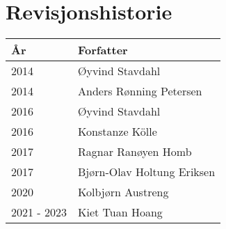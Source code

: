 \section*{Revisjonshistorie}
\begin{center}
 \begin{tabular}{|p{2.5cm} p{5.5cm}|} 
 \hline
 År & Forfatter \\ [0.5ex] 
 \hline\hline
 2014 & Øyvind Stavdahl\\
 2014 & Anders Rønning Petersen\\
 \hline
 2016 & Øyvind Stavdahl\\
 2016 & Konstanze Kölle\\
 \hline
 2017 & Ragnar Ranøyen Homb\\
 2017 & Bjørn-Olav Holtung Eriksen\\
 \hline
 2020 & Kolbjørn Austreng  \\ 
 \hline
 2021 - 2023 & Kiet Tuan Hoang \\
 \hline
\end{tabular}
\end{center}